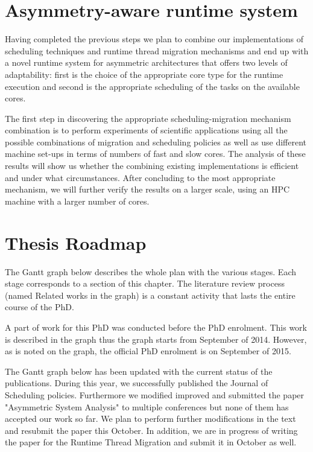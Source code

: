 \section{Asymmetry-aware runtime system}

Having completed the previous steps we plan to combine our implementations of scheduling techniques and runtime thread migration mechanisms and end up with a novel runtime system for asymmetric architectures that offers two levels of adaptability: first is the choice of the appropriate core type for the runtime execution and second is the appropriate scheduling of the tasks on the available cores.

The first step in discovering the appropriate scheduling-migration mechanism combination is to perform experiments of scientific applications using all the possible combinations of migration and scheduling policies as well as use different machine set-ups in terms of numbers of fast and slow cores.
The analysis of these results will show us whether the combining existing implementations is efficient and under what circumstances.
After concluding to the most appropriate mechanism, we will further verify the results on a larger scale, using an HPC machine with a larger number of cores.


\section{Thesis Roadmap}
The Gantt graph below describes the whole plan with the various stages. 
Each stage corresponds to a section of this chapter. 
The literature review process (named Related works in the graph) is a constant activity that lasts the entire course of the PhD.

A part of work for this PhD was conducted before the PhD enrolment.
This work is described in the graph thus the graph starts from September of 2014.
However, as is noted on the graph, the official PhD enrolment is on September of 2015.

The Gantt graph below has been updated with the current status of the publications. 
During this year, we successfully published the Journal of Scheduling policies.
Furthermore we modified improved and submitted the paper "Asymmetric System Analysis" to multiple conferences but none of them has accepted our work so far.
We plan to perform further modifications in the text and resubmit the paper this October.
In addition, we are in progress of writing the paper for the Runtime Thread Migration and submit it in October as well.


